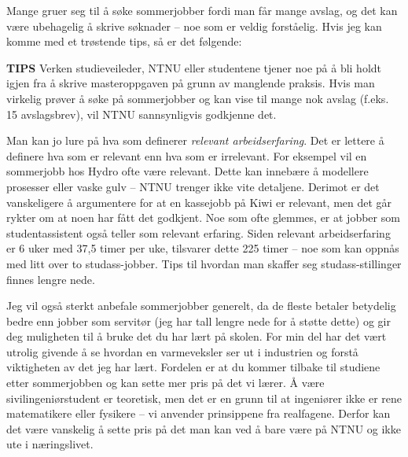 Mange gruer seg til å søke sommerjobber fordi man får mange avslag, og det kan være ubehagelig å skrive søknader – noe som er veldig forståelig. Hvis jeg kan komme med et trøstende tips, så er det følgende:

\begin{remark}
    \textbf{TIPS} Verken studieveileder, NTNU eller studentene tjener noe på å bli holdt igjen fra å skrive masteroppgaven på grunn av manglende praksis. Hvis man virkelig prøver å søke på sommerjobber og kan vise til mange nok avslag (f.eks. 15 avslagsbrev), vil NTNU sannsynligvis godkjenne det.
\end{remark}

Man kan jo lure på hva som definerer \textit{relevant arbeidserfaring}. Det er lettere å definere hva som er relevant enn hva som er irrelevant. For eksempel vil en sommerjobb hos Hydro ofte være relevant. Dette kan innebære å modellere prosesser eller vaske gulv – NTNU trenger ikke vite detaljene. Derimot er det vanskeligere å argumentere for at en kassejobb på Kiwi er relevant, men det går rykter om at noen har fått det godkjent. Noe som ofte glemmes, er at jobber som studentassistent også teller som relevant erfaring. Siden relevant arbeidserfaring er 6 uker med 37,5 timer per uke, tilsvarer dette 225 timer – noe som kan oppnås med litt over to studass-jobber. Tips til hvordan man skaffer seg studass-stillinger finnes lengre nede.

Jeg vil også sterkt anbefale sommerjobber generelt, da de fleste betaler betydelig bedre enn jobber som servitør (jeg har tall lengre nede for å støtte dette) og gir deg muligheten til å bruke det du har lært på skolen. For min del har det vært utrolig givende å se hvordan en varmeveksler ser ut i industrien og forstå viktigheten av det jeg har lært. Fordelen er at du kommer tilbake til studiene etter sommerjobben og kan sette mer pris på det vi lærer. Å være sivilingeniørstudent er teoretisk, men det er en grunn til at ingeniører ikke er rene matematikere eller fysikere – vi anvender prinsippene fra realfagene. Derfor kan det være vanskelig å sette pris på det man kan ved å bare være på NTNU og ikke ute i næringslivet.
